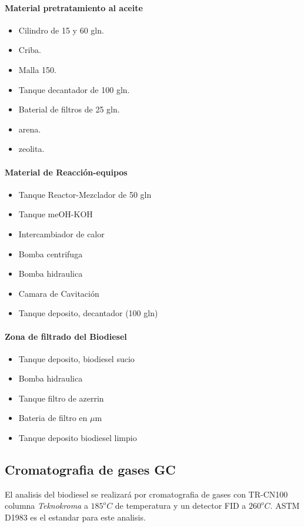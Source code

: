 \documentclass[a4paper,10pt]{article}
\begin{document}
\paragraph{Material pretratamiento al aceite}
\begin{itemize}
 \item Cilindro de 15 y 60 gln.
 \item Criba.
 \item Malla 150.
 \item Tanque decantador de 100 gln.
 \item Baterial de filtros de 25 gln.
 \item arena.
 \item zeolita.
\end{itemize}

\paragraph{Material de Reacción-equipos}
\begin{itemize}
 \item Tanque Reactor-Mezclador de 50 gln
 \item Tanque meOH-KOH
 \item Intercambiador de calor
 \item Bomba centrifuga
 \item Bomba hidraulica
 \item Camara de Cavitación
 \item Tanque deposito, decantador (100 gln)
\end{itemize}

\paragraph{Zona de filtrado del Biodiesel}
\begin{itemize}
 \item Tanque deposito, biodiesel sucio
 \item Bomba hidraulica
 \item Tanque filtro de azerrin
 \item Bateria de filtro en $\mu$m
 \item Tanque deposito biodiesel limpio
\end{itemize}

\subsection{Cromatografia de gases GC}
El  analisis del biodiesel se realizará por cromatografia de gases con TR-CN100 columna \emph{Teknokroma} a $185^o C$ de temperatura y un detector FID a $260^o C$. ASTM D1983  es el estandar para este analisis.



\end{document}
